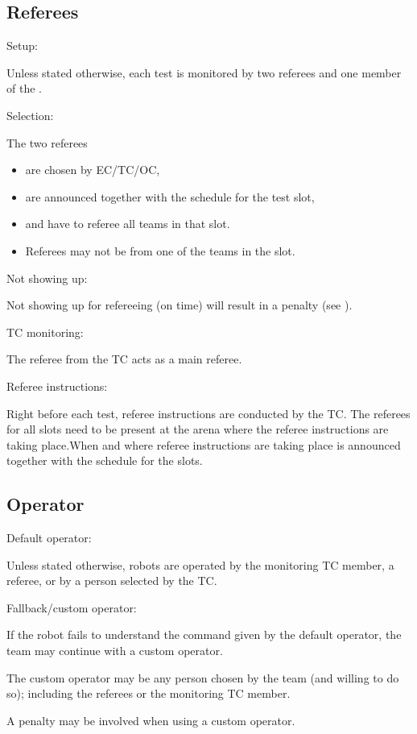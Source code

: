 \subsection{Referees}
\label{rule:referees}
\begin{enumerate}
	{\bf\item Setup:} Unless stated otherwise, each test is monitored by two referees and one member of the .
	{\bf\item Selection:} The two referees 
	\begin{itemize}
		\item are chosen by EC/TC/OC, 
		\item are announced together with the schedule for the test slot, 
		\item and have to referee all teams in that slot.
		\item Referees may not be from one of the teams in the slot.
	\end{itemize}
	{\bf\item Not showing up:} Not showing up for refereeing (on time) will result in a penalty (see ). 
	{\bf\item TC monitoring:} The referee from the TC acts as a main referee. 
	{\bf\item Referee instructions:} Right before each test, referee instructions are conducted by the TC. The referees for all slots need to be present at the arena where the referee instructions are taking place.When and where referee instructions are taking place is announced together with the schedule for the slots.
\end{enumerate}


\subsection{Operator}
\label{rule:operator}
\begin{enumerate}
	{\bf\item Default operator:} Unless stated otherwise, robots are operated by the monitoring TC member, a referee, or by a person selected by the TC.
	{\bf\item Fallback/custom operator:} If the robot fails to understand the command given by the default operator, the team may continue with a custom operator.
	\begin{compactitem}
		\item The custom operator may be any person chosen by the team (and willing to do so); including the referees or the monitoring TC member. 
		\item A penalty may be involved when using a custom operator.
	\end{compactitem}
\end{enumerate}



